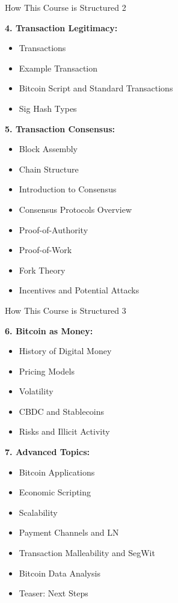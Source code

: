 \documentclass[handout]{beamer}
\begin{document}
\begin{frame}{How This Course is Structured 2}
\footnotesize	

\textbf{4. Transaction Legitimacy:}
	\begin{itemize}
		\item Transactions
		\item Example Transaction
		\item Bitcoin Script and Standard Transactions
		\item Sig Hash Types
	\end{itemize}	

\vspace{0.5em}

\textbf{5. Transaction Consensus:}
	\begin{itemize}
		\item Block Assembly
		\item Chain Structure
		\item Introduction to Consensus
		\item Consensus Protocols Overview
		\item Proof-of-Authority
		\item Proof-of-Work
		\item Fork Theory
		\item Incentives and Potential Attacks
	\end{itemize}	

\end{frame}


\begin{frame}{How This Course is Structured 3}
\footnotesize	

\textbf{6. Bitcoin as Money:}
	\begin{itemize}
		\item History of Digital Money
		\item Pricing Models
		\item Volatility
		\item CBDC and Stablecoins
		\item Risks and Illicit Activity
	\end{itemize}	

\vspace{0.5em}

\textbf{7. Advanced Topics:}
	\begin{itemize}
		\item Bitcoin Applications
		\item Economic Scripting
		\item Scalability
		\item Payment Channels and LN
		\item Transaction Malleability and SegWit
		\item Bitcoin Data Analysis
		\item Teaser: Next Steps
	\end{itemize}	

\end{frame}
\end{document}
